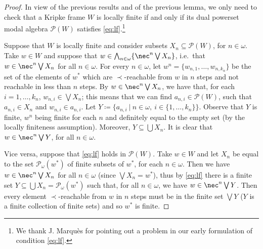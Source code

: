 \documentclass{article}
\theoremstyle{definition}
\begin{document}
\begin{proof}
In view of the previous results and of the previous lemma, we only need to check that a Kripke frame $W$ is locally finite if and only if its dual powerset modal algebra $\mathcal{P}(W)$ satisfies \cref{eq:lf}.\footnote{
We thank J. Marqu\`es for pointing out a problem in our early formulation of condition \cref{eq:lf}.
} 

Suppose that $W$ is locally finite and consider subsets $X_n \subseteq \mathcal{P}(W)$, for $n \in \omega$. Take $w\in W$ and suppose that $w \in \bigwedge_{n \in \omega} \{\nec^n \bigvee X_n\}$, i.e.\ that $w\in \nec^n \bigvee X_n$ for all $n\in \omega$. For every $n \in \omega$, let $w^n = \{w_{n,1}, \dots, w_{n,k_n}\}$ be the set of the elements of $w^*$ which are $\prec$-reachable from $w$ in $n$ steps
and not reachable in less than $n$ steps.
By $w \in \nec^n \bigvee X_n$, we have that, for each $i = 1,\dots,k_n$, $w_{n,i} \in \bigvee X_n$; this means that we can find $a_{n,i} \in \mathcal{P}(W)$, such that $a_{n,i} \in X_n$ and $w_{n,i} \in a_{n,i}$.
%
Let $Y \coloneqq \{a_{n,i}\ \vert\ n \in \omega,\ i \in \{1,\dots,k_n\}\}$. Observe that $Y$ is finite,
$w^n$ being finite for each $n$ and definitely equal to the empty set (by the locally finiteness assumption). Moreover, $Y \subseteq \bigcup X_n$.
%
It is clear that 
$w \in \nec^n \bigvee Y$, for all $n \in \omega$.
%

Vice versa, suppose that \cref{eq:lf} holds in $\mathcal{P}(W)$. Take $w\in W$ and let $X_n$ be equal to the
set $\mathcal{P}_\omega(w^*)$ of finite subsets of $w^*$, for each $n \in \omega$.
%
Then we have  $w \in \nec^n \bigvee X_n$ for all $n\in \omega$ %
(since $\bigvee X_n = w^*$),
%
thus by \cref{eq:lf} there is a finite set $Y\subseteq \bigcup X_n %
= \mathcal{P}_\omega(w^*)
$
%
such that, for all $n\in \omega$, we have
$w \in \nec^n \bigvee Y$.
%
Then  every element $\prec$-reachable from $w$ in $n$ steps must be in
the finite set $\bigvee Y$ ($Y$ is a finite collection of finite sets)
%
and so $w^*$ is finite.
\end{proof}
\end{document}
